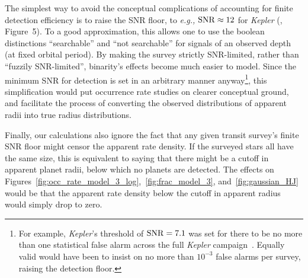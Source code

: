 \documentclass[12pt,modern]{aastex61}
\begin{document}
The simplest way to avoid the conceptual complications of accounting
for finite detection efficiency is to raise the SNR floor, to {\it
e.g.,} ${\rm SNR} \approx 12$ for {\it Kepler}
(\citealt{fulton_california-_2017}, Figure~5).  To a good
approximation, this allows one to use the boolean distinctions
``searchable'' and ``not searchable'' for signals of an observed depth
(at fixed orbital period).  By making the survey strictly SNR-limited,
rather than ``fuzzily SNR-limited'', binarity's effects become much
easier to model.  Since the minimum SNR for detection is set in an
arbitrary manner anyway\footnote{For example, {\it Kepler}'s threshold
of ${\rm SNR}=7.1$ was set for there to be no more than one
statistical false alarm across the full {\it Kepler}
campaign~\citep{jenkins_tests_2002}. Equally valid would have been to
insist on no more than $10^{-3}$ false alarms per survey, raising the
detection floor.  }, this simplification would put occurrence rate
studies on clearer conceptual ground, and facilitate the process of
converting the observed distributions of apparent radii into true
radius distributions.

Finally, our calculations also ignore the fact that any given transit
survey's finite SNR floor might censor the apparent rate density.  If
the surveyed stars all have the same size, this is equivalent to
saying that there might be a cutoff in apparent planet radii, below
which no planets are detected.  The effects on 
Figures~\ref{fig:occ_rate_model_3_log},~\ref{fig:frac_model_3},
and~\ref{fig:gaussian_HJ} would be that the apparent rate density
below the cutoff in apparent radius would simply drop to zero.

\end{document}
